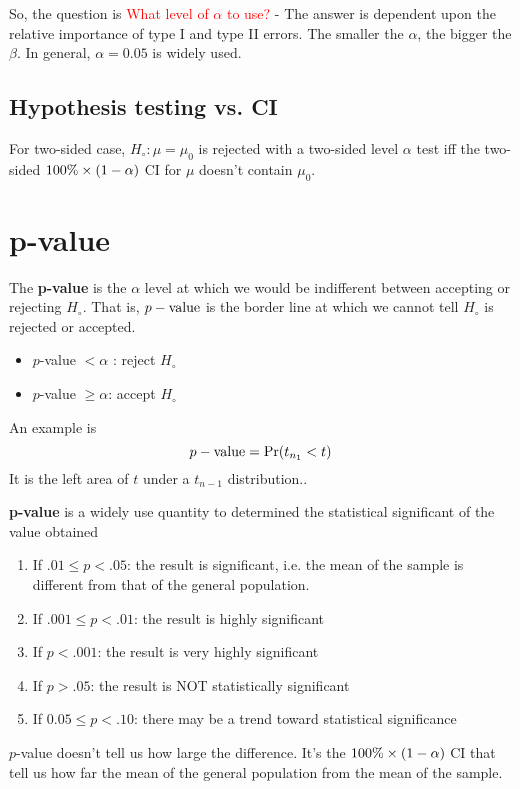 
So, the question is \textcolor{red}{What level of $\alpha$ to use?} -
The answer is dependent upon the relative importance of type I and
type II errors. The smaller the $\alpha$, the bigger the $\beta$. In
general, $\alpha=0.05$ is widely used. 


\subsection{Hypothesis testing vs. CI}
\label{sec:hypoth-test-vs}

For two-sided case, $H_\circ: \mu=\mu_0$ is rejected with a two-sided
level $\alpha$ test iff the two-sided $100\%\times (1-\alpha)$ CI for $\mu$ doesn't
contain $\mu_0$.

\section{p-value}
\label{sec:p-value}

The {\bf p-value} is the $\alpha$ level at which we would be
indifferent between accepting or rejecting $H_\circ$. That is, $p-\text{value}$
is the border line at which we cannot tell $H_\circ$ is rejected or
accepted. 
\begin{itemize}
\item $p$-value $< \alpha$ : reject $H_\circ$
\item $p$-value $\ge \alpha$: accept $H_\circ$
\end{itemize}

An example is
\begin{equation}
  \label{eq:97}
  p-\text{value} = \text{Pr}(t_{n_1} < t)
\end{equation}
It is the left area of $t$ under a $t_{n-1}$ distribution..

{\bf p-value} is a widely use quantity to determined the statistical
significant of the value obtained
\begin{enumerate}
\item If $.01 \le p < .05$: the result is significant, i.e. the mean
  of the sample is different from that of the general population.
\item If $.001 \le p < .01$: the result is highly significant
\item If $ p < .001$: the result is very highly significant
\item If $ p > .05$: the result is NOT statistically significant
\item If $ 0.05 \le p < .10$: there may be a trend toward statistical
  significance 
\end{enumerate}
$p$-value doesn't tell us how large the difference. It's the $100\%\times (1-\alpha)$ CI
that tell us how far the mean of the general population from the mean
of the sample. 


